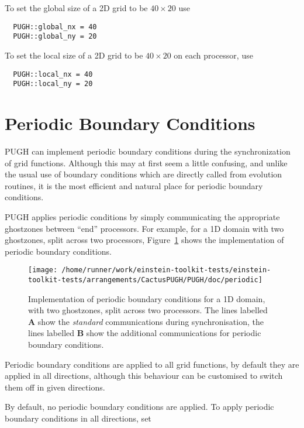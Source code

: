 \documentclass{article}
\begin{document}
To set the global size of a 2D grid to be $40\times 20$ use

\begin{verbatim}
  PUGH::global_nx = 40
  PUGH::global_ny = 20
\end{verbatim}

To set the local size of a 2D grid to be $40\times 20$ on each processor, use

\begin{verbatim}
  PUGH::local_nx = 40
  PUGH::local_ny = 20
\end{verbatim}


\section{Periodic Boundary Conditions}

PUGH can implement periodic boundary conditions during the synchronization
of grid functions. Although this may at first seem a little confusing, and
unlike the usual use of boundary conditions which are directly called from
evolution routines, it is the most efficient and natural place for periodic
boundary conditions.

PUGH applies periodic conditions by simply communicating the appropriate
ghostzones between ``end'' processors. For example, for a 1D domain with two
ghostzones, split across two processors, Figure~\ref{pugh::fig1} shows the implementation of periodic boundary conditions.

\begin{figure}[ht]
\begin{center}
\texttt{[image: /home/runner/work/einstein-toolkit-tests/einstein-toolkit-tests/arrangements/CactusPUGH/PUGH/doc/periodic]}
\end{center}
\caption[]{Implementation of periodic boundary conditions for a 1D domain, with two ghostzones, split across two processors. The lines labelled {\bf A} show the {\it standard} communications during synchronisation, the lines labelled
{\bf B} show the additional communications for periodic boundary conditions.}
\label{pugh::fig1}
\end{figure}

Periodic boundary conditions are applied to all grid functions, by default
they are applied in all directions, although this behaviour can be customised
to switch them off in given directions.

By default, no periodic boundary conditions are applied. To apply periodic boundary conditions in all directions, set
\end{document}
